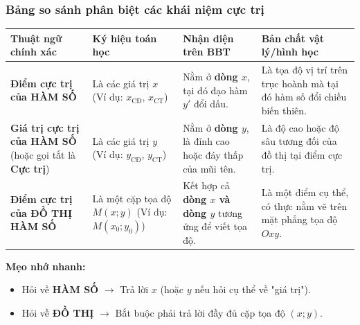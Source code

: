 \documentclass[12pt]{article}
\begin{document}
	\subsubsection{Bảng so sánh phân biệt các khái niệm cực trị}
	
	\begin{center}
		\small
		\renewcommand{\arraystretch}{1.6}
		\begin{tabular}{p{4.2cm} p{3.8cm} p{4.2cm} p{3.8cm}}
			\toprule
			\textbf{Thuật ngữ chính xác} & \textbf{Ký hiệu toán học} & \textbf{Nhận diện trên BBT} & \textbf{Bản chất vật lý/hình học} \\
			\midrule
			\textbf{Điểm cực trị của HÀM SỐ} & Là các giá trị $x$ \newline (Ví dụ: $x_{\text{CĐ}}$, $x_{\text{CT}}$) & Nằm ở \textbf{dòng $x$}, tại đó đạo hàm $y'$ đổi dấu. & Là tọa độ vị trí trên trục hoành mà tại đó hàm số đổi chiều biến thiên. \\
			\midrule
			\textbf{Giá trị cực trị của HÀM SỐ} \newline (hoặc gọi tắt là \textbf{Cực trị}) & Là các giá trị $y$ \newline (Ví dụ: $y_{\text{CĐ}}$, $y_{\text{CT}}$) & Nằm ở \textbf{dòng $y$}, là đỉnh cao hoặc đáy thấp của mũi tên. & Là độ cao hoặc độ sâu tương đối của đồ thị tại điểm cực trị. \\
			\midrule
			\textbf{Điểm cực trị của ĐỒ THỊ HÀM SỐ} & Là một cặp tọa độ $M(x; y)$ \newline (Ví dụ: $M(x_0; y_0)$) & Kết hợp cả \textbf{dòng $x$ và dòng $y$} tương ứng để viết tọa độ. & Là một điểm cụ thể, có thực nằm vẽ trên mặt phẳng tọa độ $Oxy$. \\
			\bottomrule
		\end{tabular}
	\end{center}
	
	\vspace{3mm}
	\textbf{Mẹo nhớ nhanh:}
	\begin{itemize}
		\item Hỏi về \textbf{HÀM SỐ} $\rightarrow$ Trả lời $x$ (hoặc $y$ nếu hỏi cụ thể về "giá trị").
		\item Hỏi về \textbf{ĐỒ THỊ} $\rightarrow$ Bắt buộc phải trả lời đầy đủ cặp tọa độ $(x; y)$.
	\end{itemize}
	
\end{document}
